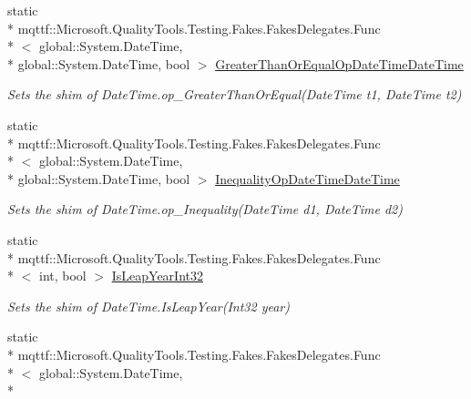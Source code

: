 \begin{DoxyCompactItemize}
static \\*
mqttf\-::\-Microsoft.\-Quality\-Tools.\-Testing.\-Fakes.\-Fakes\-Delegates.\-Func\\*
$<$ global\-::\-System.\-Date\-Time, \\*
global\-::\-System.\-Date\-Time, bool $>$ \hyperlink{class_system_1_1_fakes_1_1_shim_date_time_ae11b556de4d295a02bc91ca9a9ce7881}{Greater\-Than\-Or\-Equal\-Op\-Date\-Time\-Date\-Time}
\begin{DoxyCompactList}\small\item\em Sets the shim of Date\-Time.\-op\-\_\-\-Greater\-Than\-Or\-Equal(\-Date\-Time t1, Date\-Time t2)\end{DoxyCompactList}\item 
static \\*
mqttf\-::\-Microsoft.\-Quality\-Tools.\-Testing.\-Fakes.\-Fakes\-Delegates.\-Func\\*
$<$ global\-::\-System.\-Date\-Time, \\*
global\-::\-System.\-Date\-Time, bool $>$ \hyperlink{class_system_1_1_fakes_1_1_shim_date_time_a0b6327ff3ee4df6b3417b3ac7446febb}{Inequality\-Op\-Date\-Time\-Date\-Time}
\begin{DoxyCompactList}\small\item\em Sets the shim of Date\-Time.\-op\-\_\-\-Inequality(\-Date\-Time d1, Date\-Time d2)\end{DoxyCompactList}\item 
static \\*
mqttf\-::\-Microsoft.\-Quality\-Tools.\-Testing.\-Fakes.\-Fakes\-Delegates.\-Func\\*
$<$ int, bool $>$ \hyperlink{class_system_1_1_fakes_1_1_shim_date_time_a36fa550237bc42aae874846cccb3ac3e}{Is\-Leap\-Year\-Int32}
\begin{DoxyCompactList}\small\item\em Sets the shim of Date\-Time.\-Is\-Leap\-Year(\-Int32 year)\end{DoxyCompactList}\item 
static \\*
mqttf\-::\-Microsoft.\-Quality\-Tools.\-Testing.\-Fakes.\-Fakes\-Delegates.\-Func\\*
$<$ global\-::\-System.\-Date\-Time, \\*

\end{DoxyCompactItemize}
